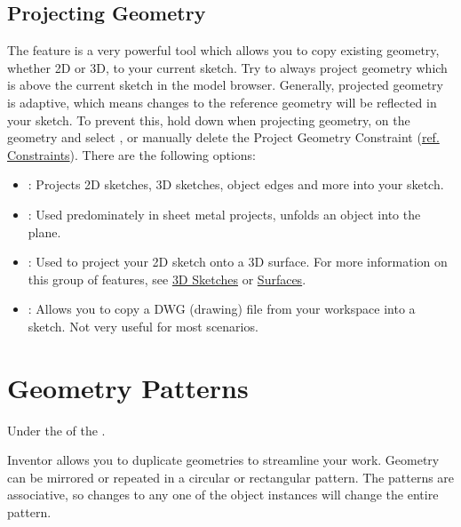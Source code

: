 \subsection{Projecting Geometry}


The  feature is a very powerful tool which allows you to copy existing geometry, whether 2D or 3D, to your current sketch. Try to always project geometry which is above the current sketch in the model browser. Generally, projected geometry is adaptive, which means changes to the reference geometry will be reflected in your sketch. To prevent this, hold down  when projecting geometry,  on the geometry and select , or manually delete the Project Geometry Constraint (\hyperref[section: Constraints and Dimensions]{ref. Constraints}). There are the following options:

\begin{itemize}
\item {}: Projects 2D sketches, 3D sketches, object edges and more into your sketch.
\item {}: Used predominately in sheet metal projects, unfolds an object into the plane.
\item {}: Used to project your 2D sketch onto a 3D surface. For more information on this group of features, see \hyperref[chapter: 3D Sketches]{3D Sketches} or \hyperref[section: Surfaces]{Surfaces}.
\item {}:  Allows you to copy a DWG (drawing) file from your workspace into a sketch. Not very useful for most scenarios.
\end{itemize}



\section{Geometry Patterns}

\begin{where-to-find}
    Under the  of the .
    \end{where-to-find}
    

Inventor allows you to duplicate geometries to streamline your work. Geometry can be \newline mirrored or repeated in a circular or rectangular pattern. The patterns are associative, so changes to any one of the object instances will change the entire pattern.



